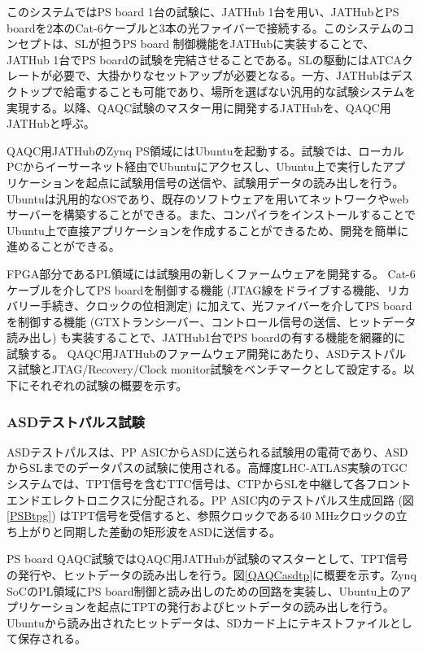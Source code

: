 このシステムではPS board 1台の試験に、JATHub 1台を用い、JATHubとPS boardを2本のCat-6ケーブルと3本の光ファイバーで接続する。このシステムのコンセプトは、SLが担うPS board 制御機能をJATHubに実装することで、JATHub 1台でPS boardの試験を完結させることである。SLの駆動にはATCAクレートが必要で、大掛かりなセットアップが必要となる。一方、JATHubはデスクトップで給電することも可能であり、場所を選ばない汎用的な試験システムを実現する。以降、QAQC試験のマスター用に開発するJATHubを、QAQC用JATHubと呼ぶ。

QAQC用JATHubのZynq PS領域にはUbuntuを起動する。試験では、ローカルPCからイーサーネット経由でUbuntuにアクセスし、Ubuntu上で実行したアプリケーションを起点に試験用信号の送信や、試験用データの読み出しを行う。Ubuntuは汎用的なOSであり、既存のソフトウェアを用いてネットワークやwebサーバーを構築することができる。また、コンパイラをインストールすることでUbuntu上で直接アプリケーションを作成することができるため、開発を簡単に進めることができる。

FPGA部分であるPL領域には試験用の新しくファームウェアを開発する。
Cat-6ケーブルを介してPS boardを制御する機能 (JTAG線をドライブする機能、リカバリー手続き、クロックの位相測定) に加えて、光ファイバーを介してPS boardを制御する機能 (GTXトランシーバー、コントロール信号の送信、ヒットデータ読み出し) も実装することで、JATHub1台でPS boardの有する機能を網羅的に試験する。
QAQC用JATHubのファームウェア開発にあたり、ASDテストパルス試験とJTAG/Recovery/Clock monitor試験をベンチマークとして設定する。以下にそれぞれの試験の概要を示す。

\subsubsection{ASDテストパルス試験}
\baselineskip
\label{subsubsec_testpulse}
ASDテストパルスは、PP ASICからASDに送られる試験用の電荷であり、ASDからSLまでのデータパスの試験に使用される。高輝度LHC-ATLAS実験のTGCシステムでは、TPT信号を含むTTC信号は、CTPからSLを中継して各フロントエンドエレクトロニクスに分配される。PP ASIC内のテストパルス生成回路 (図\ref{PSBtpg}) はTPT信号を受信すると、参照クロックである40 MHzクロックの立ち上がりと同期した差動の矩形波をASDに送信する。


PS board QAQC試験ではQAQC用JATHubが試験のマスターとして、TPT信号の発行や、ヒットデータの読み出しを行う。図\ref{QAQCasdtp}に概要を示す。Zynq SoCのPL領域にPS board制御と読み出しのための回路を実装し、Ubuntu上のアプリケーションを起点にTPTの発行およびヒットデータの読み出しを行う。Ubuntuから読み出されたヒットデータは、SDカード上にテキストファイルとして保存される。

